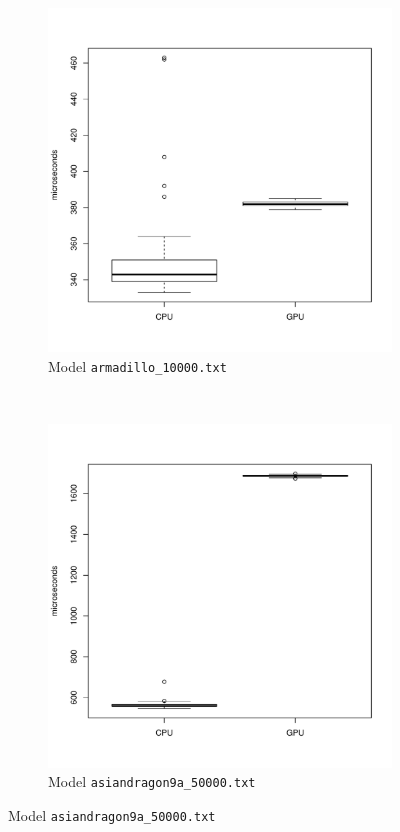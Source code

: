 	\begin{figure}
		\centering
		\begin{subfigure}[b]{0.45\textwidth}
			\includegraphics[width=\textwidth]{results/armadillo}
			\caption{Model \texttt{armadillo\_10000.txt}}
		\end{subfigure}
		~%
		\begin{subfigure}[b]{0.45\textwidth}
			\includegraphics[width=\textwidth]{results/asiandragon9a_50000}
			\caption{Model \texttt{asiandragon9a\_50000.txt}}
		\end{subfigure}
		

\end{figure}
